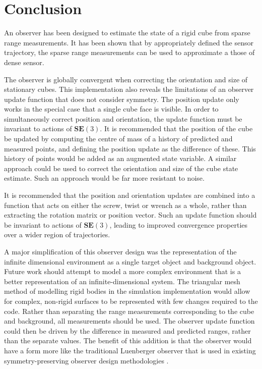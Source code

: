 \chapter*{Conclusion}

An observer has been designed to estimate the state of a rigid cube from sparse range measurements. It has been shown that by appropriately defined the sensor trajectory, the sparse range measurements can be used to approximate a those of dense sensor.

The observer is globally convergent when correcting the orientation and size of stationary cubes. This implementation also reveals the limitations of an observer update function that does not consider symmetry. The position update only works in the special case that a single cube face is visible. In order to simultaneously correct position and orientation, the update function must be invariant to actions of $\mathbf{SE}(3)$.
It is recommended that the position of the cube be updated by computing the centre of mass of a history of predicted and measured points, and defining the position update as the difference of these. This history of points would be added as an augmented state variable. A similar approach could be used to correct the orientation and size of the cube state estimate. Such an approach would be far more resistant to noise.

It is recommended that the position and orientation updates are combined into a function that acts on either the screw, twist or wrench as a whole, rather than extracting the rotation matrix or position vector. Such an update function should be invariant to actions of $\mathbf{SE}(3)$, leading to improved convergence properties over a wider region of trajectories.

A major simplification of this observer design was the representation of the infinite dimensional environment as a single target object and background object. Future work should attempt to model a more complex environment that is a better representation of an infinite-dimensional system. The triangular mesh method of modelling rigid bodies in the simulation implementation would allow for complex, non-rigid surfaces to be represented with few changes required to the code. Rather than separating the range measurements corresponding to the cube and background, all measurements should be used. The observer update function could then be driven by the difference in measured and predicted ranges, rather than the separate values. The benefit of this addition is that the observer would have a form more like the traditional Luenberger observer that is used in existing symmetry-preserving observer design methodologies \cite{bonnabel2009non,mahony2013observers}.



